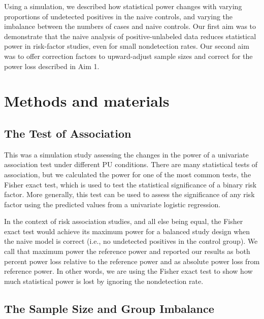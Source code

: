 \documentclass[
]{article}
\begin{document}
Using a simulation, we described how statistical power changes with
varying proportions of undetected positives in the naive controls, and
varying the imbalance between the numbers of cases and naive controls.
Our first aim was to demonstrate that the naive analysis of
positive-unlabeled data reduces statistical power in risk-factor
studies, even for small nondetection rates. Our second aim was to offer
correction factors to upward-adjust sample sizes and correct for the
power loss described in Aim 1.

\hypertarget{methods-and-materials}{%
\section{Methods and materials}\label{methods-and-materials}}

\hypertarget{the-test-of-association}{%
\subsection{The Test of Association}\label{the-test-of-association}}

This was a simulation study assessing the changes in the power of a
univariate association test under different PU conditions. There are
many statistical tests of association, but we calculated the power for
one of the most common tests, the Fisher exact test, which is used to
test the statistical significance of a binary risk factor. More
generally, this test can be used to assess the significance of any risk
factor using the predicted values from a univariate logistic regression.

In the context of risk association studies, and all else being equal,
the Fisher exact test would achieve its maximum power for a balanced
study design when the naive model is correct (i.e., no undetected
positives in the control group). We call that maximum power the
reference power and reported our results as both percent power loss
relative to the reference power and as absolute power loss from
reference power. In other words, we are using the Fisher exact test to
show how much statistical power is lost by ignoring the nondetection
rate.

\hypertarget{the-sample-size-and-group-imbalance}{%
\subsection{The Sample Size and Group
Imbalance}\label{the-sample-size-and-group-imbalance}}
\end{document}
